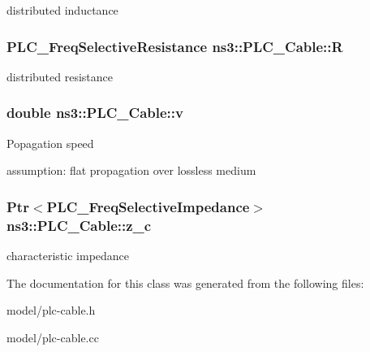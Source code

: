 distributed inductance \hypertarget{classns3_1_1PLC__Cable_a1770f66065636bde27fa4d8e35c8a534}{
\subsubsection[{\-R}]{\setlength{\rightskip}{0pt plus 5cm}\-P\-L\-C\-\_\-\-Freq\-Selective\-Resistance {\bf ns3\-::\-P\-L\-C\-\_\-\-Cable\-::\-R}}}\label{classns3_1_1PLC__Cable_a1770f66065636bde27fa4d8e35c8a534}
distributed resistance \hypertarget{classns3_1_1PLC__Cable_abbc2c9cb7b669f4c30c5a15669b9d3ea}{
\subsubsection[{v}]{\setlength{\rightskip}{0pt plus 5cm}double {\bf ns3\-::\-P\-L\-C\-\_\-\-Cable\-::v}}}\label{classns3_1_1PLC__Cable_abbc2c9cb7b669f4c30c5a15669b9d3ea}
\-Popagation speed

assumption\-: flat propagation over lossless medium \hypertarget{classns3_1_1PLC__Cable_a510fc016469182d4a8d0864f291f5968}{
\subsubsection[{z\-\_\-c}]{\setlength{\rightskip}{0pt plus 5cm}\-Ptr$<${\bf \-P\-L\-C\-\_\-\-Freq\-Selective\-Impedance}$>$ {\bf ns3\-::\-P\-L\-C\-\_\-\-Cable\-::z\-\_\-c}}}\label{classns3_1_1PLC__Cable_a510fc016469182d4a8d0864f291f5968}
characteristic impedance 

\-The documentation for this class was generated from the following files\-:\begin{DoxyCompactItemize}
\item 
model/plc-\/cable.\-h\item 
model/plc-\/cable.\-cc\end{DoxyCompactItemize}
